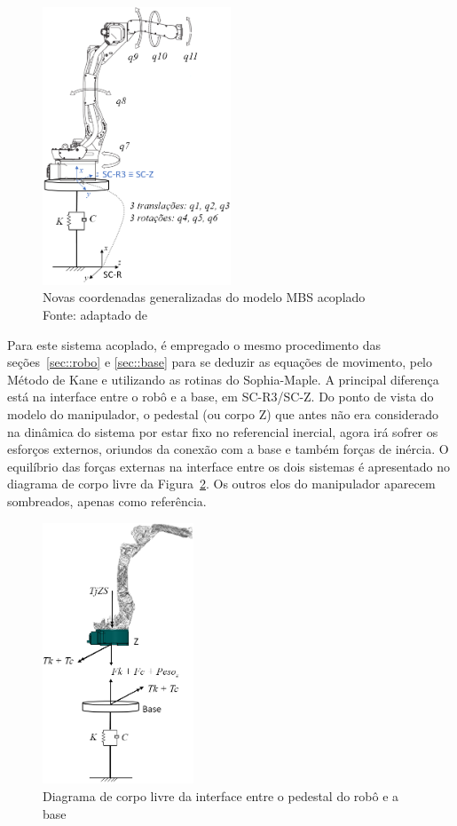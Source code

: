 \begin{figure}[h]
	\centering 
 	\includegraphics[width=0.50\textwidth]{figs/esq_acoplado}
 	\caption[Novas coordenadas generalizadas do modelo MBS acoplado]{Novas
 	coordenadas generalizadas do modelo MBS acoplado \\
 	Fonte: adaptado de}
 	\label{fig::esq_acoplado}
\end{figure}

Para este sistema acoplado, é empregado o mesmo procedimento das
seções~\ref{sec::robo} e \ref{sec::base} para se deduzir as equações de
movimento, pelo Método de Kane e utilizando as rotinas do Sophia-Maple. A
principal diferença está na interface entre o robô e a base, em SC-R3/SC-Z.
Do ponto de vista do modelo do manipulador, o pedestal (ou corpo Z) que
antes não era considerado na dinâmica do sistema por estar fixo no referencial
inercial, agora irá sofrer os esforços externos, oriundos da conexão com a base
e também forças de inércia. O equilíbrio das forças externas na interface entre
os dois sistemas é apresentado no diagrama de corpo livre da
Figura~\ref{fig::dcl_interface}. Os outros elos do manipulador aparecem
sombreados, apenas como referência.

\begin{figure}[h]
	\centering 
 	\includegraphics[width=0.40\textwidth]{figs/dcl_interface}
 	\caption{Diagrama de corpo livre da interface entre o pedestal do robô e a
 	base}
 	\label{fig::dcl_interface}
\end{figure}

